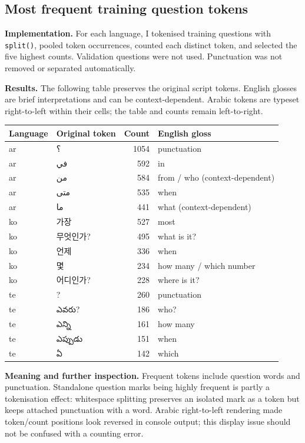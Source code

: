 \documentclass[11pt,a4paper]{article}
\newcommand{\AR}[1]{{\arabicfont\beginR #1\endR}}
\newcommand{\KO}[1]{{\koreanfont #1}}
\newcommand{\TE}[1]{{\telugufont #1}}
\begin{document}
\subsection{Most frequent training question tokens}
\textbf{Implementation.} For each language, I tokenised training questions with \texttt{split()}, pooled token occurrences, counted each distinct token, and selected the five highest counts. Validation questions were not used. Punctuation was not removed or separated automatically.

\textbf{Results.} The following table preserves the original script tokens. English glosses are brief interpretations and can be context-dependent. Arabic tokens are typeset right-to-left within their cells; the table and counts remain left-to-right.
\begin{center}
\small
\begin{tabular}{llrl}
\toprule
Language & Original token & Count & English gloss \\
\midrule
ar & \AR{؟} & 1054 & punctuation \\
ar & \AR{في} & 592 & in \\
ar & \AR{من} & 584 & from / who (context-dependent) \\
ar & \AR{متى} & 535 & when \\
ar & \AR{ما} & 441 & what (context-dependent) \\
\midrule
ko & \KO{가장} & 527 & most \\
ko & \KO{무엇인가?} & 495 & what is it? \\
ko & \KO{언제} & 336 & when \\
ko & \KO{몇} & 234 & how many / which number \\
ko & \KO{어디인가?} & 228 & where is it? \\
\midrule
te & ? & 260 & punctuation \\
te & \TE{ఎవరు?} & 186 & who? \\
te & \TE{ఎన్ని} & 161 & how many \\
te & \TE{ఎప్పుడు} & 151 & when \\
te & \TE{ఏ} & 142 & which \\
\bottomrule
\end{tabular}
\end{center}

\textbf{Meaning and further inspection.} Frequent tokens include question words and punctuation. Standalone question marks being highly frequent is partly a tokenisation effect: whitespace splitting preserves an isolated mark as a token but keeps attached punctuation with a word. Arabic right-to-left rendering made token/count positions look reversed in console output; this display issue should not be confused with a counting error.
\end{document}
